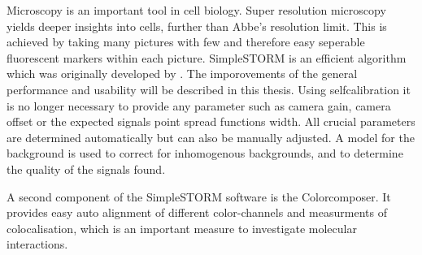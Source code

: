 Microscopy is an important tool in cell biology. Super resolution microscopy yields deeper insights into cells, further than Abbe's resolution limit. This is achieved by taking many pictures with few and therefore easy seperable fluorescent markers within each picture.\newline
SimpleSTORM is an efficient algorithm which was originally developed by \cite{MAJoachim}. The imporovements of the general performance and usability will be described in this thesis.\newline
Using selfcalibration it is no longer necessary to provide any parameter such as camera gain, camera offset or the expected signals point spread functions width. All crucial parameters are determined automatically but can also be manually adjusted. 
A model for the background is used to correct for inhomogenous backgrounds, and to determine the quality of the signals found.\newline

A second component of the SimpleSTORM software is the Colorcomposer. It provides easy auto alignment of different color-channels and measurments of colocalisation, which is an important measure to investigate molecular interactions.

